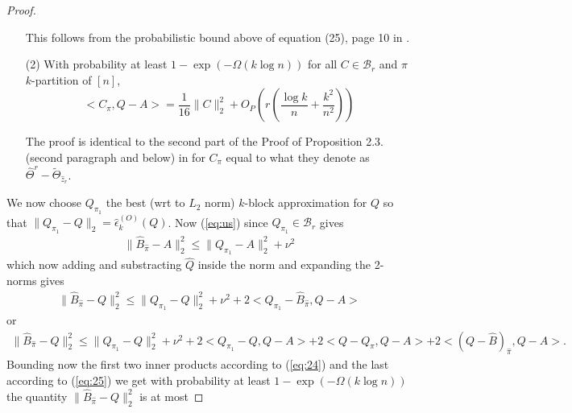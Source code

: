 \documentclass[12pt]{article}
\newtheorem{lemma}[theorem]{Lemma}
\begin{document}
\begin{proof}
\begin{itemize}
This follows from the probabilistic bound above of equation (25), page 10 in \cite{TsybK}.
\item[(2)] With probability at least $1-\exp\left(-\Omega(k \log n)\right)$ for all $C \in \mathcal{B}_{r}$ and $\pi $ $k$-partition of $[n]$,
\begin{equation}\label{eq:25}
<C_{\pi},Q-A> = \frac{1}{16}\|C\|_2^2+O_P \left( r( \frac{\log k}{n}+\frac{k^2}{n^2}  )\right) 
\end{equation}

The proof is identical to the second part of the Proof of Proposition 2.3. (second paragraph and below) in \cite{TsybK} for $C_{\pi}$ equal to what they denote as $\hat{\Theta}^r-\tilde{\Theta}_{\hat{z}_r}$.



\end{itemize}


We now choose $Q_{\pi_1}$ the best (wrt to $L_2$ norm) $k$-block approximation for $Q$ so that $\|Q_{\pi_1}-Q\|_2=\hat{\epsilon}_k^{(O)}(Q)$. Now (\ref{eq:us}) since $Q_{\pi_1} \in \mathcal{B}_r$ gives
\begin{align*}
\|\hat{B}_{\hat{\pi}}-A\|_2^2 \leq \|Q_{\pi_1}-A\|_2^2+\nu^2
\end{align*} 
which now adding and substracting $\hat{Q}$ inside the norm and expanding the 2-norms gives
\begin{align*}
\|\hat{B}_{\hat{\pi}}-Q\|_2^2 \leq \|Q_{\pi_1}-Q\|_2^2+\nu^2+2<Q_{\pi_1}-\hat{B}_{\hat{\pi}},Q-A>
\end{align*} 
or
\begin{align*}
\|\hat{B}_{\hat{\pi}}-Q\|_2^2 \leq \|Q_{\pi_1}-Q\|_2^2+\nu^2+2<Q_{\pi_1}-Q,Q-A>+2<Q-Q_{\hat{\pi}},Q-A>+2<(Q-\hat{B})_{\hat{\pi}},Q-A>.
\end{align*} 
Bounding now the first two inner products according to (\ref{eq:24}) and the last according to (\ref{eq:25}) we get with probability at least $1-\exp\left(-\Omega(k \log n)\right)$ the quantity $\|\hat{B}_{\hat{\pi}}-Q\|_2^2$ is at most


\end{proof}
\end{document}
